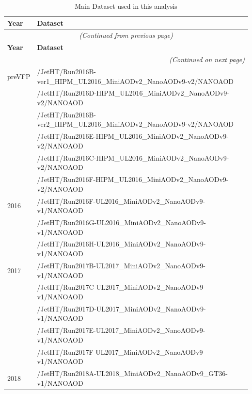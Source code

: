 \documentclass[twoside]{article}
\begin{document}
\begin{longtable}{|l|l|}
\caption{Main Dataset used in this analysis} \label{tab:maindataset}\\
    
    \hline
    \textbf{Year} & \textbf{Dataset} \\
    \hline \hline
    \endfirsthead

    \multicolumn{2}{c}{\textit{(Continued from previous page)}} \\
    \hline
    \textbf{Year} & \textbf{Dataset} \\
    \hline \hline
    \endhead

    \hline
    \multicolumn{2}{r}{\textit{(Continued on next page)}} \\
    \endfoot

    \hline
    \endlastfoot
    2016 preVFP & /JetHT/Run2016B-ver1\_HIPM\_UL2016\_MiniAODv2\_NanoAODv9-v2/NANOAOD \\
                 & /JetHT/Run2016D-HIPM\_UL2016\_MiniAODv2\_NanoAODv9-v2/NANOAOD \\
                 & /JetHT/Run2016B-ver2\_HIPM\_UL2016\_MiniAODv2\_NanoAODv9-v2/NANOAOD \\
                 & /JetHT/Run2016E-HIPM\_UL2016\_MiniAODv2\_NanoAODv9-v2/NANOAOD \\
                 & /JetHT/Run2016C-HIPM\_UL2016\_MiniAODv2\_NanoAODv9-v2/NANOAOD \\
                 & /JetHT/Run2016F-HIPM\_UL2016\_MiniAODv2\_NanoAODv9-v2/NANOAOD \\
    \hline
    2016 & /JetHT/Run2016F-UL2016\_MiniAODv2\_NanoAODv9-v1/NANOAOD \\
         & /JetHT/Run2016G-UL2016\_MiniAODv2\_NanoAODv9-v1/NANOAOD \\
         & /JetHT/Run2016H-UL2016\_MiniAODv2\_NanoAODv9-v1/NANOAOD \\
    \hline
    2017 & /JetHT/Run2017B-UL2017\_MiniAODv2\_NanoAODv9-v1/NANOAOD \\
         & /JetHT/Run2017C-UL2017\_MiniAODv2\_NanoAODv9-v1/NANOAOD \\
         & /JetHT/Run2017D-UL2017\_MiniAODv2\_NanoAODv9-v1/NANOAOD \\
         & /JetHT/Run2017E-UL2017\_MiniAODv2\_NanoAODv9-v1/NANOAOD \\
         & /JetHT/Run2017F-UL2017\_MiniAODv2\_NanoAODv9-v1/NANOAOD \\
    \hline
    2018 & /JetHT/Run2018A-UL2018\_MiniAODv2\_NanoAODv9\_GT36-v1/NANOAOD \\

\end{longtable}
\end{document}
